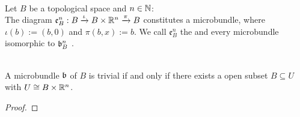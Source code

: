 \\Let $B$ be a topological space and $n \in \mathbb{N}$:
\\ The diagram $\mathfrak{e}^n_B: B \xrightarrow{\iota} B \times \mathbb{R}^n \xrightarrow{\pi} B{}$ constitutes a microbundle, where
$\iota(b) := (b, 0)$ and $\pi(b, x) := b$.
We call $\mathfrak{e}^n_B$ the  and every microbundle isomorphic to $\mathfrak{b}^n_B$ .

\\ A microbundle $\mathfrak{b}$ of $B$ is trivial if and only if there exists a open subset $B \subseteq U$ with $U \cong B \times \mathbb{R}^n$.
\begin{proof}
    
\end{proof}